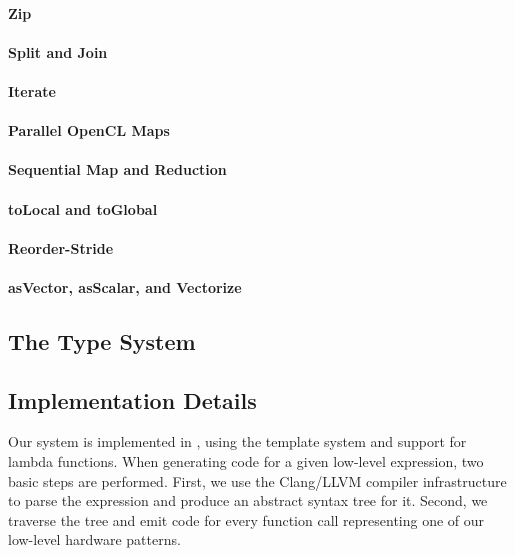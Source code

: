 \paragraph{Zip}

\paragraph{Split and Join}

\paragraph{Iterate}

\paragraph{Parallel OpenCL Maps}

\paragraph{Sequential Map and Reduction}

\paragraph{{\footnotesize to}Local and {\footnotesize to}Global}

\paragraph{Reorder-Stride}

\paragraph{{\footnotesize as}Vector, {\footnotesize as}Scalar, and Vectorize}



\subsection{The Type System}

\subsection{Implementation Details}
Our system is implemented in \Cpp, using the template system and support for lambda functions. 
When generating code for a given low-level expression, two basic steps are performed.
First, we use the Clang/LLVM compiler infrastructure to parse the expression and produce an abstract syntax tree for it.
Second, we traverse the tree and emit code for every function call representing one of our low-level hardware patterns.

